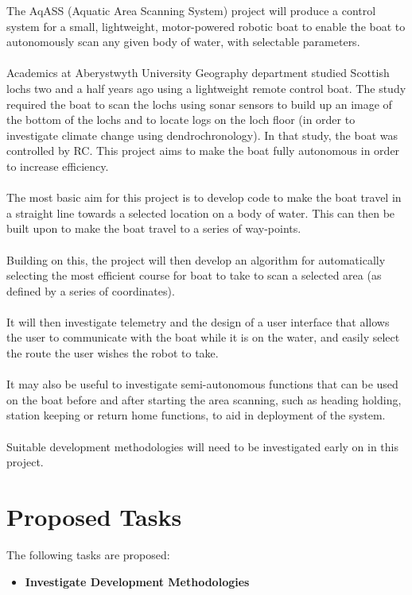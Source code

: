 \documentclass[titlepage 12pt]{article}
\begin{document}
{The AqASS (Aquatic Area Scanning System) project will produce a control system for a small, lightweight, motor-powered robotic boat to enable the boat to autonomously scan any given body of water, with selectable parameters. 
\\ \noindent
\\Academics at Aberystwyth University Geography department studied Scottish lochs two and a half years ago using a  lightweight remote control boat. The study required the boat to scan the lochs using sonar sensors to build up an image of the bottom of the lochs and to locate logs on the loch floor (in order to investigate climate change using dendrochronology)\cite{rbates14}. In that study, the boat was controlled by RC. This project aims to make the boat fully autonomous in order to increase efficiency.
\\ \noindent
\\The most basic aim for this project is to develop code to make the boat travel in a straight line towards a selected location on a body of water. This can then be built upon to make the boat travel to a series of way-points.
\\ \noindent
\\Building on this, the project will then develop an algorithm for automatically selecting the most efficient course for boat to take to scan a selected area (as defined by a series of coordinates). 
\\ \noindent
\\It will then investigate telemetry and the design of a user interface that allows the user to communicate with the boat while it is on the water, and easily select the route the user wishes the robot to take. 
\\ \noindent
\\It may also be useful to investigate semi-autonomous functions that can be used on the boat before and after starting the area scanning, such as heading holding, station keeping or return home functions, to aid in deployment of the system.
      \\ \noindent    
\\Suitable development methodologies will need to be investigated early on in this project.

\section{Proposed Tasks}
The following tasks are proposed:
\begin{itemize}
\item \textbf{Investigate Development Methodologies}


\end{itemize}}
\end{document}
